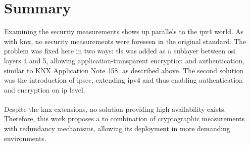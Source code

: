 \section{Summary}
Examining the security measurements shows up parallels to the \gls{ipv4} world. As with \gls{knx}, no security measurements were foreseen in the
original standard. The problem was
fixed here in two ways: \gls{tls} was added as a sublayer between \gls{osi} layers 4 and 5, allowing application-transparent encryption and authentication, 
similar to KNX Application Note 158, as described above. The second solution was the introduction of \gls{ipsec}, extending \gls{ipv4} and thus enabling authentication and encryption on \gls{ip} level.
\\
\\
Despite the \gls{knx} extensions, no solution providing high availability exists. Therefore, this work proposes a to combination of cryptographic measurements with
redundancy mechanisms, allowing its deployment in more demanding environments.